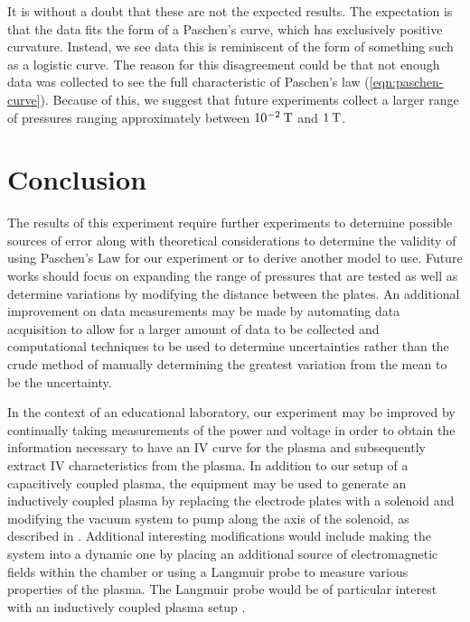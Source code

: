 \documentclass[reprint]{revtex4-1}
\begin{document}
It is without a doubt that these are not the expected results. The expectation is that the data fits the form of a Paschen's curve, which has exclusively positive curvature. Instead, we see data this is reminiscent of the form of something such as a logistic curve. The reason for this disagreement could be that not enough data was collected to see the full characteristic of Paschen's law (\cref{eqn:paschen-curve}). Because of this, we suggest that future experiments collect a larger range of pressures ranging approximately between $10^{-2}\:\rm{T}$ and $1\:\rm{T}$.


\section{Conclusion}

The results of this experiment require further experiments to determine possible sources of error along with theoretical considerations to determine the validity of using Paschen's Law for our experiment or to derive another model to use. Future works should focus on expanding the range of pressures that are tested as well as determine variations by modifying the distance between the plates. An additional improvement on data measurements may be made by automating data acquisition to allow for a larger amount of data to be collected and computational techniques to be used to determine uncertainties rather than the crude method of manually determining the greatest variation from the mean to be the uncertainty.

In the context of an educational laboratory, our experiment may be improved by continually taking measurements of the power and voltage in order to obtain the information necessary to have an IV curve for the plasma and subsequently extract IV characteristics from the plasma. In addition to our setup of a capacitively coupled plasma,  the equipment may be used to generate an inductively coupled plasma by replacing the electrode plates with a solenoid and modifying the vacuum system to pump along the axis of the solenoid, as described in \cite{physics-radio-frequency,Jiayin2010}. Additional interesting modifications would include making the system into a dynamic one by placing an additional source of electromagnetic fields within the chamber or using a Langmuir probe to measure various properties of the plasma. The Langmuir probe would be of particular interest with an inductively coupled plasma setup \cite{Hopwood1993}.


\end{document}
